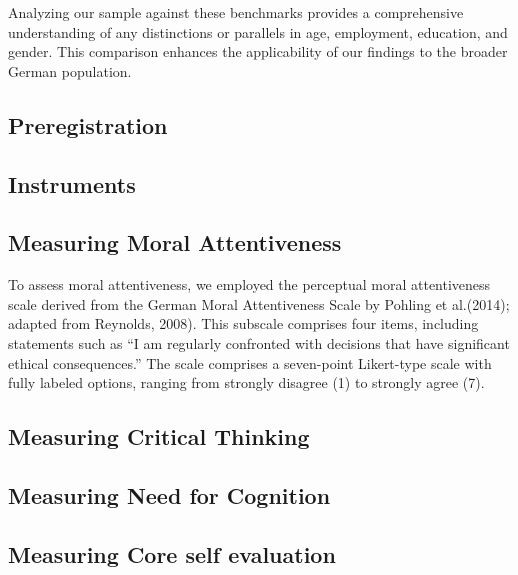 \documentclass[
  12pt,
  a4paper,
  twoside]{article}
\begin{document}
Analyzing our sample against these benchmarks provides a comprehensive understanding of any distinctions or parallels in age, employment, education, and gender. This comparison enhances the applicability of our findings to the broader German population.

\hypertarget{preregistration}{%
\subsection{Preregistration}\label{preregistration}}

\hypertarget{instruments}{%
\subsection{Instruments}\label{instruments}}

\hypertarget{measuring-moral-attentiveness}{%
\subsection{Measuring Moral Attentiveness}\label{measuring-moral-attentiveness}}

To assess moral attentiveness, we employed the perceptual moral attentiveness scale derived from the German Moral Attentiveness Scale by Pohling et al.(2014); adapted from Reynolds, 2008). This subscale comprises four items, including statements such as ``I am regularly confronted with decisions that have significant ethical consequences.'' The scale comprises a seven-point Likert-type scale with fully labeled options, ranging from strongly disagree (1) to strongly agree (7).

\hypertarget{measuring-critical-thinking}{%
\subsection{Measuring Critical Thinking}\label{measuring-critical-thinking}}

\hypertarget{measuring-need-for-cognition}{%
\subsection{Measuring Need for Cognition}\label{measuring-need-for-cognition}}

\hypertarget{measuring-core-self-evaluation}{%
\subsection{Measuring Core self evaluation}\label{measuring-core-self-evaluation}}
\end{document}
